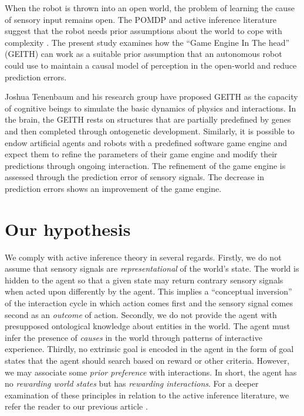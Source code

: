 \documentclass[runningheads]{llncs}
\begin{document}
When the robot is thrown into an open world, the problem of learning the cause of sensory input remains open. 
The POMDP and active inference literature suggest that the robot needs prior assumptions about the world to cope with complexity \cite{georgeon_artificial_2024}. 
The present study examines how the ``Game Engine In The head'' (GEITH) can work as a suitable prior assumption that an autonomous robot could use to maintain a causal model of perception in the open-world and reduce prediction errors. 

Joshua Tenenbaum and his research group have proposed GEITH \cite{battaglia_simulation_2013} as the capacity of cognitive beings to simulate the basic dynamics of physics and interactions. 
In the brain, the GEITH rests on structures that are partially predefined by genes and then completed through ontogenetic development.  
Similarly, it is possible to endow artificial agents and robots with a predefined software game engine and expect them to refine the parameters of their game engine and modify their predictions through ongoing interaction.
The refinement of the game engine is assessed through 
the prediction error of sensory signals. 
The decrease in prediction errors shows an improvement of the game engine. 




\section{Our hypothesis}

We comply with active inference theory in several regards. 
Firstly, we do not assume that sensory signals are \textit{representational} of the world's state. 
The world is hidden to the agent so that a given state may return contrary sensory signals when acted upon differently by the agent.
This implies a ``conceptual inversion'' of the interaction cycle in which action comes first and the sensory signal comes second as an  \textit{outcome} of action. 
Secondly, we do not provide the agent with presupposed ontological knowledge about entities in the world. 
The agent must infer the 
presence of \textit{causes} in the world 
through patterns of interactive experience. 
Thirdly, no extrinsic goal is encoded in the agent in the form of goal states that the agent should search based on reward or other criteria. 
However, we may associate some \textit{prior preference} with interactions. 
In short, the agent has no \textit{rewarding world states} but has \textit{rewarding interactions}. %
For a deeper examination of these principles in relation to the active inference literature, we refer the reader to 
our previous article 
\cite{georgeon_artificial_2024}.
\end{document}

